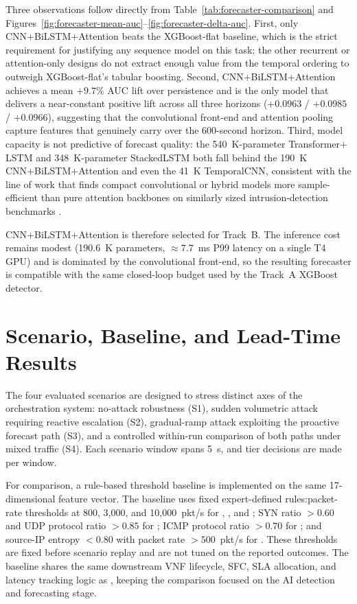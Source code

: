 Three observations follow directly from
Table~\ref{tab:forecaster-comparison} and
Figures~\ref{fig:forecaster-mean-auc}--\ref{fig:forecaster-delta-auc}. First, only CNN+BiLSTM+Attention beats the XGBoost-flat baseline, which is the strict requirement for justifying any sequence model on this task; the other recurrent or attention-only designs do not extract enough value from the temporal ordering to outweigh XGBoost-flat's tabular boosting. Second, CNN+BiLSTM+Attention achieves a mean $+9.7\%$ AUC lift over persistence and is the only model that delivers a near-constant positive lift across all three horizons ($+0.0963$ / $+0.0985$ / $+0.0966$), suggesting that the convolutional front-end and attention pooling capture features that genuinely carry over the 600-second horizon. Third, model capacity is not predictive of forecast quality: the 540~K-parameter Transformer$+$LSTM and 348~K-parameter StackedLSTM both fall behind the 190~K CNN+BiLSTM+Attention and even the 41~K TemporalCNN, consistent with the line of work that finds compact
convolutional or hybrid models more sample-efficient than pure attention backbones on similarly sized intrusion-detection benchmarks
\cite{alanazi2022ensembleddos, cnnbilstmattn2025}.

CNN+BiLSTM+Attention is therefore selected for Track~B. The inference cost remains modest (190.6~K parameters, $\approx 7.7$~ms P99 latency on a single T4 GPU) and is dominated by the convolutional front-end, so the resulting forecaster is compatible with the same closed-loop budget used by the Track~A XGBoost detector.

\section{Scenario, Baseline, and Lead-Time Results}
\label{sec:results}

The four evaluated scenarios are designed to stress distinct axes of the orchestration system: no-attack robustness (S1), sudden volumetric attack requiring reactive escalation (S2), gradual-ramp attack exploiting the proactive forecast path (S3), and a controlled within-run comparison of both paths under mixed traffic (S4). Each scenario window spans 5~s, and tier decisions are made per window.

For comparison, a rule-based threshold baseline is implemented on the same 17-dimensional feature vector. The baseline uses fixed expert-defined rules:packet-rate thresholds at 800, 3{,}000, and 10{,}000~pkt/s for , , and ; SYN ratio $>0.60$ and UDP protocol ratio $>0.85$ for ; ICMP protocol ratio $>0.70$ for ; and source-IP entropy $<0.80$ with packet rate $>500$~pkt/s for . These thresholds are fixed before scenario replay and are not tuned on the reported outcomes. The baseline shares the same downstream VNF lifecycle, SFC, SLA allocation, and latency tracking logic as \padonap{}, keeping the comparison focused on the AI detection and forecasting stage.

